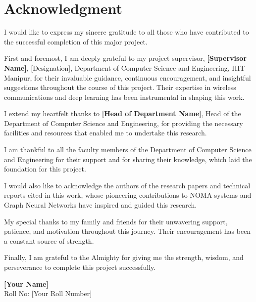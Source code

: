 \chapter*{Acknowledgment}

\vspace{1cm}

I would like to express my sincere gratitude to all those who have contributed to the successful completion of this major project.

First and foremost, I am deeply grateful to my project supervisor, \textbf{[Supervisor Name]}, [Designation], Department of Computer Science and Engineering, IIIT Manipur, for their invaluable guidance, continuous encouragement, and insightful suggestions throughout the course of this project. Their expertise in wireless communications and deep learning has been instrumental in shaping this work.

I extend my heartfelt thanks to \textbf{[Head of Department Name]}, Head of the Department of Computer Science and Engineering, for providing the necessary facilities and resources that enabled me to undertake this research.

I am thankful to all the faculty members of the Department of Computer Science and Engineering for their support and for sharing their knowledge, which laid the foundation for this project.

I would also like to acknowledge the authors of the research papers and technical reports cited in this work, whose pioneering contributions to NOMA systems and Graph Neural Networks have inspired and guided this research.

My special thanks to my family and friends for their unwavering support, patience, and motivation throughout this journey. Their encouragement has been a constant source of strength.

Finally, I am grateful to the Almighty for giving me the strength, wisdom, and perseverance to complete this project successfully.

\vspace{2cm}

\begin{flushright}
\textbf{[Your Name]} \\
Roll No: [Your Roll Number]
\end{flushright}

\newpage
